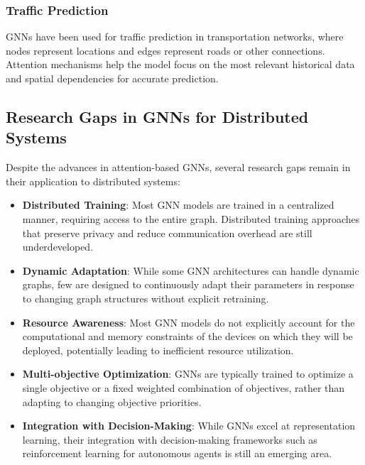 \documentclass{article}
\begin{document}
\subsubsection{Traffic Prediction}

GNNs have been used for traffic prediction in transportation networks, where nodes represent locations and edges represent roads or other connections. Attention mechanisms help the model focus on the most relevant historical data and spatial dependencies for accurate prediction.

\subsection{Research Gaps in GNNs for Distributed Systems}

Despite the advances in attention-based GNNs, several research gaps remain in their application to distributed systems:

\begin{itemize}
    \item \textbf{Distributed Training}: Most GNN models are trained in a centralized manner, requiring access to the entire graph. Distributed training approaches that preserve privacy and reduce communication overhead are still underdeveloped.
    
    \item \textbf{Dynamic Adaptation}: While some GNN architectures can handle dynamic graphs, few are designed to continuously adapt their parameters in response to changing graph structures without explicit retraining.
    
    \item \textbf{Resource Awareness}: Most GNN models do not explicitly account for the computational and memory constraints of the devices on which they will be deployed, potentially leading to inefficient resource utilization.
    
    \item \textbf{Multi-objective Optimization}: GNNs are typically trained to optimize a single objective or a fixed weighted combination of objectives, rather than adapting to changing objective priorities.
    
    \item \textbf{Integration with Decision-Making}: While GNNs excel at representation learning, their integration with decision-making frameworks such as reinforcement learning for autonomous agents is still an emerging area.
\end{itemize}
\end{document}
